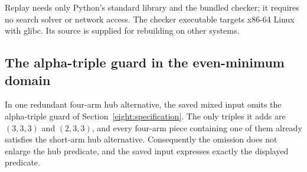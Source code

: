 Replay needs only Python's standard library and the bundled checker; it requires no search solver or network access. The checker executable targets x86-64 Linux with glibc. Its source is supplied for rebuilding on other systems.

\subsection{The alpha-triple guard in the even-minimum domain}
\label{eight:verification}
In one redundant four-arm hub alternative, the saved mixed input omits the alpha-triple guard of Section~\ref{eight:specification}. The only triples it adds are $(3,3,3)$ and $(2,3,3)$, and every four-arm piece containing one of them already satisfies the short-arm hub alternative. Consequently the omission does not enlarge the hub predicate, and the saved input expresses exactly the displayed predicate.
